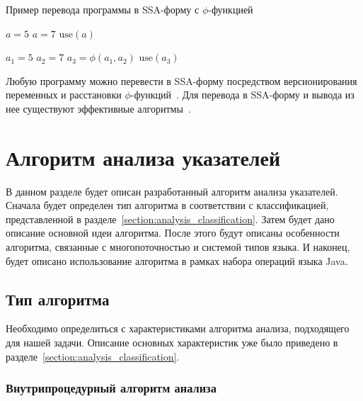 \documentclass[14pt,titlepage]{extarticle}
\let\oldphi\phi
\renewcommand{\phi}{\ensuremath{\oldphi}}
\newcommand{\eng}[1]{{\English#1}}
\let\oldsection\section
\renewcommand{\section}{\newpage\oldsection}
\newcommand{\java}{\eng{Java}\xspace}
\begin{document}
    \begin{algorithm}
      \caption{Пример перевода программы в SSA-форму с \phi-функцией}
      \label{code:ssa_with_phi}
      \begin{multicols}{2}
        \begin{algorithmic}[1]
          \IF{\ldots}
            \STATE $a = 5$
          \ELSE
            \STATE $a = 7$
          \ENDIF
          \STATE $\textrm{use}(a)$
        \end{algorithmic}
        \columnbreak
        \begin{algorithmic}[1]
          \IF{\ldots}
            \STATE $a_1 = 5$
          \ELSE
            \STATE $a_2 = 7$
          \ENDIF
          \STATE $a_3 = \phi(a_1, a_2)$
          \STATE $\textrm{use}(a_3)$
        \end{algorithmic}
      \end{multicols}
    \end{algorithm}

    Любую программу можно перевести в SSA-форму посредством
    версионирования переменных и расстановки \phi-функций~\cite{ssa}.
    Для перевода в SSA-форму и вывода из нее существуют эффективные
    алгоритмы~\cite{bilardi_ssa, briggs_ssa}.

  \section{Алгоритм анализа указателей}
    \label{section:algorithm}

    В данном разделе будет описан разработанный алгоритм анализа указателей.
    Сначала будет определен тип алгоритма в соответствии с классификацией,
    представленной в разделе~\ref{section:analysis_classification}.
    Затем будет дано описание основной идеи алгоритма.
    После этого будут описаны особенности алгоритма, связанные с
    многопоточностью и системой типов языка.
    И наконец, будет описано использование алгоритма в рамках набора операций
    языка \java.

    \subsection{Тип алгоритма}

      Необходимо определиться с характеристиками алгоритма анализа,
      подходящего для нашей задачи. Описание основных характеристик уже было
      приведено в разделе~\ref{section:analysis_classification}.

      \subsubsection{Внутрипроцедурный алгоритм анализа}
\end{document}
